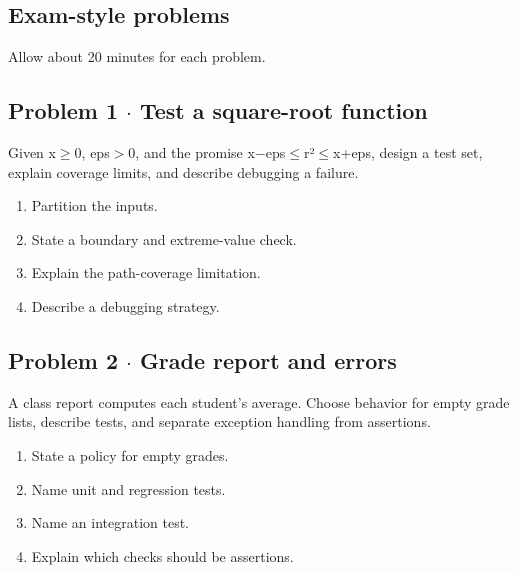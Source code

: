 \documentclass[11pt]{article}
\begin{document}
\begin{keepsection}
\section{Exam-style problems}

Allow about 20 minutes for each problem.

\begin{keepsection}
\subsection{Problem 1 \ensuremath{\cdot} Test a square-root function}

Given x\ensuremath{\geq}0, eps\ensuremath{>}0, and the promise x\ensuremath{-}eps\ensuremath{\leq}r²\ensuremath{\leq}x+eps, design a test set, explain coverage limits, and describe debugging a failure.

\begin{enumerate}
\item Partition the inputs.
\item State a boundary and extreme-value check.
\item Explain the path-coverage limitation.
\item Describe a debugging strategy.
\end{enumerate}

\end{keepsection}

\begin{keepsection}
\subsection{Problem 2 \ensuremath{\cdot} Grade report and errors}

A class report computes each student's average. Choose behavior for empty grade lists, describe tests, and separate exception handling from assertions.

\begin{enumerate}
\item State a policy for empty grades.
\item Name unit and regression tests.
\item Name an integration test.
\item Explain which checks should be assertions.
\end{enumerate}

\end{keepsection}
\end{keepsection}
\end{document}
